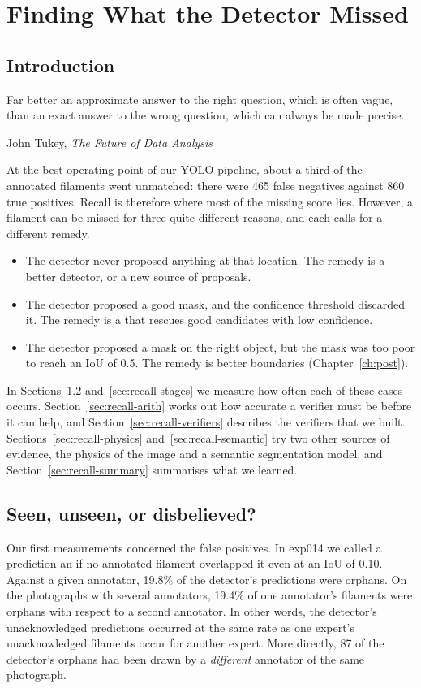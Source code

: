 \chapter{Finding What the Detector Missed}\label{ch:recall}

\section{Introduction}\label{sec:recall-intro}
\epigraph{Far better an approximate answer to the right question, which is often vague, than an exact
answer to the wrong question, which can always be made precise.}{John Tukey, \emph{The Future of Data
Analysis} \citeyearpar[p.~13]{tukey1962}}

At the best operating point of our YOLO pipeline, about a third of the annotated filaments went
unmatched: there were 465 false negatives against 860 true positives. Recall is therefore where most
of the missing score lies. However, a filament can be missed for three quite different reasons, and
each calls for a different remedy.
\begin{itemize}[leftmargin=*,itemsep=2pt]
\item The detector never proposed anything at that location. The remedy is a better detector, or a
new source of proposals.
\item The detector proposed a good mask, and the confidence threshold discarded it. The remedy is a
 that rescues good candidates with low confidence.
\item The detector proposed a mask on the right object, but the mask was too poor to reach an IoU of
0.5. The remedy is better boundaries (Chapter~\ref{ch:post}).
\end{itemize}

In Sections~\ref{sec:recall-orphans} and~\ref{sec:recall-stages} we measure how often each of these
cases occurs. Section~\ref{sec:recall-arith} works out how accurate a verifier must be before it can
help, and Section~\ref{sec:recall-verifiers} describes the verifiers that we built.
Sections~\ref{sec:recall-physics} and~\ref{sec:recall-semantic} try two other sources of evidence,
the physics of the image and a semantic segmentation model, and Section~\ref{sec:recall-summary}
summarises what we learned.

\section{Seen, unseen, or disbelieved?}\label{sec:recall-orphans}
Our first measurements concerned the false positives. In exp014 we called a prediction an
 if no annotated filament overlapped it even at an IoU of 0.10. Against a given
annotator, 19.8\% of the detector's predictions were orphans. On the photographs with several
annotators, 19.4\% of one annotator's filaments were orphans with respect to a second annotator. In
other words, the detector's unacknowledged predictions occurred at the same rate as one expert's
unacknowledged filaments occur for another expert. More directly, 87 of the detector's orphans had
been drawn by a \emph{different} annotator of the same photograph.

